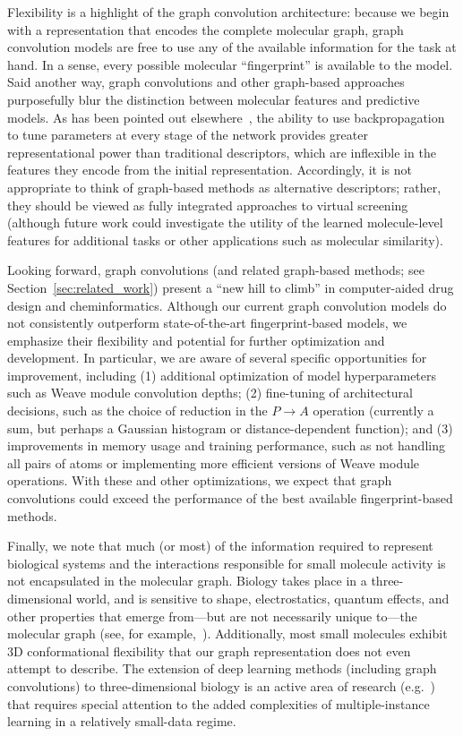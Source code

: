 Flexibility is a highlight of the graph
convolution architecture: because we begin with a representation that encodes
the complete molecular graph, graph convolution models are free to use any of
the available information for the task at hand. In a sense, every possible
molecular ``fingerprint'' is available to the model.
Said another way, graph convolutions and other graph-based approaches
purposefully blur the distinction between molecular features and predictive
models. As has been pointed out elsewhere~\citep{duvenaud2015convolutional}, the
ability to use backpropagation to tune parameters at every stage of the network
provides greater representational power than traditional descriptors, which are
inflexible in the features they encode from the initial representation.
Accordingly, it is not appropriate to think of graph-based methods as
alternative descriptors; rather, they should be viewed as fully integrated
approaches to virtual screening (although future work could investigate the
utility of the learned molecule-level features for additional tasks or other
applications such as molecular similarity).

Looking forward, graph convolutions (and related graph-based methods; see
Section~\ref{sec:related_work}) present a ``new hill to climb'' in
computer-aided drug design and cheminformatics. Although our current graph
convolution models do not consistently outperform state-of-the-art
fingerprint-based models, we emphasize their flexibility and potential for
further optimization and development. In particular, we are aware of several
specific opportunities for improvement, including (1) additional optimization of
model hyperparameters such as Weave module convolution depths; (2) fine-tuning
of architectural decisions, such as the choice of reduction in the $P
\rightarrow A$ operation (currently a sum, but perhaps a Gaussian histogram or
distance-dependent function); and (3) improvements in memory usage and training
performance, such as not handling all pairs of atoms or implementing more
efficient versions of Weave module operations. With these and other
optimizations, we expect that graph convolutions could exceed the performance of
the best available fingerprint-based methods.

Finally, we note that much (or most) of the information required to represent
biological systems and the interactions responsible for small molecule activity
is not encapsulated in the molecular graph. Biology takes place in a
three-dimensional world, and is sensitive to shape, electrostatics, quantum
effects, and other properties that emerge from---but are not necessarily unique
to---the molecular graph (see, for example,~\citet{nicholls2010molecular}).
Additionally, most small molecules exhibit 3D conformational flexibility that
our graph representation does not even attempt to describe. The extension of
deep learning methods (including graph convolutions) to three-dimensional
biology is an active area of research (e.g.~\citet{wallach2015atomnet})
that requires special attention to the added complexities of multiple-instance
learning in a relatively small-data regime.



